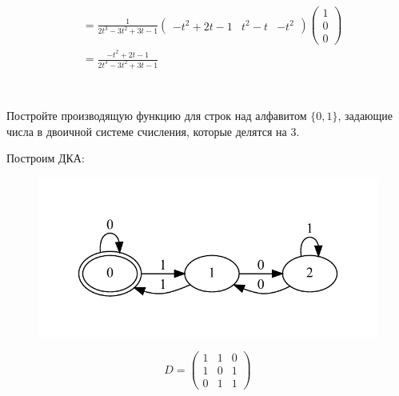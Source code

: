 \begin{align*}
         & = \frac{1}{2 t^3 - 3 t^2 + 3 t - 1} \begin{pmatrix} - t^2 + 2t - 1 & t^2 - t & - t^2 \end{pmatrix}
    \begin{pmatrix} 1 \\ 0 \\ 0 \end{pmatrix}                                                                                                                 \\
         & = \frac{- t^2 + 2t - 1}{2 t^3 - 3 t^2 + 3 t - 1}                                                                                    \\
\end{align*}

\section{}
Постройте производящую функцию для строк над алфавитом $\{0, 1\}$, задающие числа в двоичной системе счисления, которые делятся на 3.

Построим ДКА:
\begin{figure}[h]
    \includegraphics[scale=0.7]{images/74.pdf}
\end{figure}

\[D = \begin{pmatrix}
        1 & 1 & 0 \\
        1 & 0 & 1 \\
        0 & 1 & 1
    \end{pmatrix} \]

